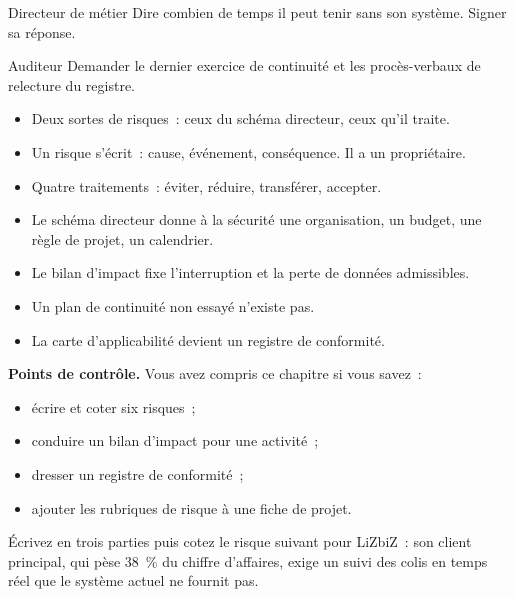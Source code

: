 \begin{boxmetier}{Directeur de métier}
Dire combien de temps il peut tenir sans son système. Signer sa réponse.
\end{boxmetier}

\begin{boxmetier}{Auditeur}
Demander le dernier exercice de continuité et les procès-verbaux de relecture du registre.
\end{boxmetier}

\begin{boxresume}
\begin{itemize}
    \item Deux sortes de risques~: ceux du schéma directeur, ceux qu'il traite.
    \item Un risque s'écrit~: cause, événement, conséquence. Il a un propriétaire.
    \item Quatre traitements~: éviter, réduire, transférer, accepter.
    \item Le schéma directeur donne à la sécurité une organisation, un budget, une règle de projet, un calendrier.
    \item Le bilan d'impact fixe l'interruption et la perte de données admissibles.
    \item Un plan de continuité non essayé n'existe pas.
    \item La carte d'applicabilité devient un registre de conformité.
\end{itemize}
\end{boxresume}

\begin{boxinfo}
\textbf{Points de contrôle.} Vous avez compris ce chapitre si vous savez~:
\begin{itemize}
    \item écrire et coter six risques~;
    \item conduire un bilan d'impact pour une activité~;
    \item dresser un registre de conformité~;
    \item ajouter les rubriques de risque à une fiche de projet.
\end{itemize}
\end{boxinfo}

\begin{boxexo}[title={\ding{45}\quad Exercice~14.1. Coter \niveaubase}]
Écrivez en trois parties puis cotez le risque suivant pour LiZbiZ~: son client principal, qui pèse 38~\% du chiffre d'affaires, exige un suivi des colis en temps réel que le système actuel ne fournit pas.
\end{boxexo}

